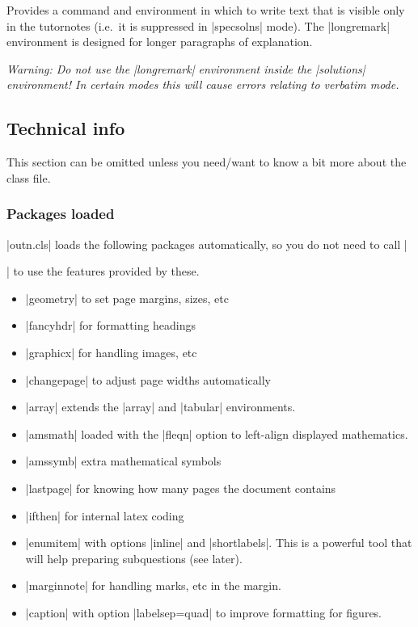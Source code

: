 \documentclass[a4paper]{ltxguide}
\newcommand\3{\unskip\enspace\fbox{\fontsize{4}{4}\selectfont NEW 3.0}}
\begin{document}
Provides a command and environment in which to write text that is visible only in the tutornotes (i.e.\ it is suppressed in |specsolns| mode). The |longremark| environment is designed for longer paragraphs of explanation.

\emph{Warning: Do not use the |longremark| environment inside the |solutions| environment! In certain modes this will cause errors relating to verbatim mode.}

\subsection{Technical info}
This section can be omitted unless you need/want to know a bit more about the class file.

\subsubsection{Packages loaded}
|outn.cls| loads the following packages automatically, so you do not need to call |\usepackage{...}| to use the features provided by these.

\begin{itemize}
\item |geometry| to set page margins, sizes, etc
\item |fancyhdr| for formatting headings
\item |graphicx| for handling images, etc
\item |changepage| to adjust page widths automatically
\item |array| extends the |array| and |tabular| environments.
\item |amsmath| loaded with the |fleqn| option to left-align displayed mathematics.
\item |amssymb| extra mathematical symbols
\item |lastpage| for knowing how many pages the document contains
\item |ifthen| for internal latex coding
\item |enumitem| with options |inline| and |shortlabels|. This is a powerful tool that will help preparing subquestions (see later).
\item |marginnote| for handling marks, etc in the margin.
\item |caption| with option |labelsep=quad| to improve formatting for figures.
\end{itemize}



%
%
%
%
%
%
%
%
%
%
\end{document}
